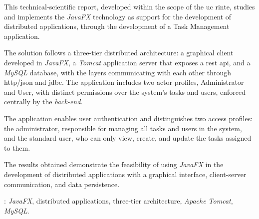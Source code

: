 \begin{secondlangabstract}

This technical-scientific report, developed within the scope of the \ac{uc} \ac{rinte}, studies and implements the \textit{JavaFX} technology as support for the development of distributed applications, through the development of a Task Management application.

The solution follows a three-tier distributed architecture: a graphical client developed in \textit{JavaFX}, a \textit{Tomcat} application server that exposes a \ac{rest} \ac{api}, and a \textit{MySQL} database, with the layers communicating with each other through \ac{http}/\ac{json} and \ac{jdbc}. The application includes two actor profiles, Administrator and User, with distinct permissions over the system's tasks and users, enforced centrally by the \textit{back-end}. 

The application enables user authentication and distinguishes two access profiles: the administrator, responsible for managing all tasks and users in the system, and the standard user, who can only view, create, and update the tasks assigned to them.

The results obtained demonstrate the feasibility of using \textit{JavaFX} in the development of distributed applications with a graphical interface, client-server communication, and data persistence.

\vspace*{10mm} 
\noindent
\textbf{\keywordslabel}: \textit{JavaFX}, distributed applications, three-tier architecture, \textit{Apache Tomcat}, \textit{MySQL}.
\end{secondlangabstract}

